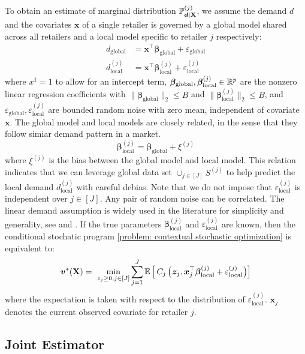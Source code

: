 \documentclass[mnsc, nonblindrev]{informswp}
\newcommand{\1}[1]{\mathds{1}{\left(#1\right)}}
\begin{document}
To obtain an estimate of marginal distribution $\mathbb{P}^{(j)}_{\bm d \mid {\mathbf{X}}}$, we assume the demand $d$ and the covariates $\bm x$ of a single retailer is governed by a global model shared across all retailers and a local model specific to retailer $j$ respectively:
\begin{align*}
d_{\text{global}} & = \bm x ^ \top {\bm \beta}_{\text{global}}  + \varepsilon_{\text{global}} \\
d_{\text{local}}^{(j)} & = \bm x ^ \top {\bm \beta}^{(j)}_{\text{local}}  + \varepsilon_{\text{local}}^{(j)}
\end{align*}
where $x^1 =1$ to allow for an intercept term, ${\bm \beta}_{\text{global}}, {\bm \beta}^{(j)}_{\text{local}} \in \mathbb{R}^p$ are the nonzero linear regression coefficients with $\|{\bm \beta}_{\text{global}}  \|_2 \leq B$ and $\| {\bm \beta}^{(j)}_{\text{local}} \|_2 \leq B$, and $\varepsilon_{\text{global}}, \varepsilon_{\text{local}}^{(j)}$ are bounded random noise with zero mean, independent of covariate $\bm x$.  The global model and local models are closely related, in the sense that they follow simiar demand pattern in a market.
\[
{\bm \beta}^{(j)}_{\text{local}} =  {\bm \beta}_{\text{global}}  + \xi^{(j)}
\]
where $\xi^{(j)}$ is the bias between the global model and local model. This relation indicates that we can leverage global data set $\cup_{j \in [J]} S^{(j)}$ to help predict the local demand $d_{\text{local}}^{(j)}$ with careful debias. Note that we do not impose that $\varepsilon_{\text{local}}^{(j)}$ is independent over $j \in [J]$. Any pair of random noise can be correlated. 
The linear demand assumption is widely used in the literature for simplicity and generality, see \citet{Ban_Rudin_2019big} and \citet{huang2025taylor}. If the true parameters $ {\bm \beta}^{(j)}_{\text{local}}$ and ${\varepsilon}^{(j)}_{\text{local}}$ are known, then the conditional stochatic program \eqref{problem: contextual stochastic optimization} is equivalent to:
\begin{equation}
\bm v^*({\mb X}) = \ 
\min_{ z_j \geq 0, j\in[J]}
 \sum_{j=1}^J 
\mathbb{E} \left[\,C_j \left( \bm z_j, \bm x_j^\top  {\bm \beta}^{(j)}_{\text{local}} + \varepsilon_{\text{local}}^{(j)} \right) \right]
\label{problem: CSP with regression}
\end{equation}
where the expectation is taken with respect to the distribution of $\varepsilon_{\text{local}}^{(j)}$. $\bm x_j$ denotes the current observed covariate for retailer $j$.

\subsection* {Joint Estimator}  %
\end{document}
